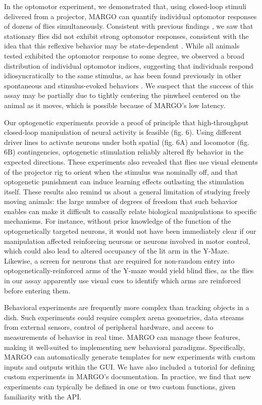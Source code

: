 \documentclass[12pt,letterpaper]{article}
\begin{document}
In the optomotor experiment, we demonstrated that, using closed-loop stimuli delivered from a projector, MARGO can quantify individual optomotor responses of dozens of flies simultaneously. Consistent with previous findings \cite{Zhu_Peripheral_2009,Kim_Fly_2016}, we saw that stationary flies did not exhibit strong optomotor responses, consistent with the idea that this reflexive behavior may be state-dependent \cite{Rosner_Behavioural_2009, Rien_Octopaminergic_2013, Chiappe_Walking_2010, Maimon_Active_2010,gorostiza_2018}. While all animals tested exhibited the optomotor response to some degree, we observed a broad distribution of individual optomotor indices, suggesting that individuals respond idiosyncratically to the same stimulus, as has been found previously in other spontaneous and stimulus-evoked behaviors \cite{Kain_Phototactic_2012,Kain_Leg_2013,Kain_Variability_2015,Buchanan_Neuronal_2015,Todd_Systematic_2017}. We suspect that the success of this assay may be partially due to tightly centering the pinwheel centered on the animal as it moves, which is possible because of MARGO's low latency.

Our optogenetic experiments provide a proof of principle that high-throughput closed-loop manipulation of neural activity is feasible (fig. 6). Using different driver lines to activate neurons under both spatial (fig. 6A) and locomotor (fig. 6B) contingencies, optogenetic stimulation reliably altered fly behavior in the expected directions. These experiments also revealed that flies use visual elements of the projector rig to orient when the stimulus was nominally off, and that optogenetic punishment can induce learning effects outlasting the stimulation itself. These results also remind us about a general limitation of studying freely moving animals: the large number of degrees of freedom that such behavior enables can make it difficult to causally relate biological manipulations to specific mechanisms. For instance, without prior knowledge of the function of the optogenetically targeted neurons, it would not have been immediately clear if our manipulation affected reinforcing neurons or neurons involved in motor control, which could also lead to altered occupancy of the lit arm in the Y-Maze. Likewise, a screen for neurons that are required for non-random entry into optogenetically-reinforced arms of the Y-maze would yield blind flies, as the flies in our assay apparently use visual cues to identify which arms are reinforced before entering them.

Behavioral experiments are frequently more complex than tracking objects in a dish. Such experiments could require complex arena geometries, data streams from external sensors, control of peripheral hardware, and access to measurements of behavior in real time. MARGO can manage these features, making it well-suited to implementing new behavioral paradigms. Specifically, MARGO can automatically generate templates for new experiments with custom inputs and outputs within the GUI. We have also included a tutorial for defining custom experiments in MARGO's documentation. In practice, we find that new experiments can typically be defined in one or two custom functions, given familiarity with the API.
\end{document}
